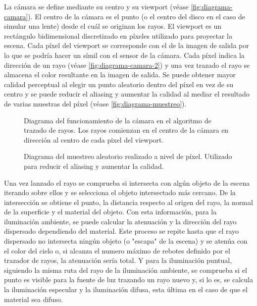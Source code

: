\documentclass[10pt, a4paper]{article}
\begin{document}
La cámara se define mediante su centro y su viewport (véase \autoref{fig:diagrama-camara}). El centro de la cámara es el punto (o el centro del disco en el caso de simular una lente) desde el cuál se originan los rayos. El viewport es un rectángulo bidimensional discretizado en píxeles utilizado para proyectar la escena. Cada píxel del viewport se corresponde con el de la imagen de salida por lo que se podría hacer un símil con el sensor de la cámara. Cada píxel indica la dirección de un rayo (véase \autoref{fig:diagrama-camara-2}) y una vez trazado el rayo se almacena el color resultante en la imagen de salida. Se puede obtener mayor calidad perceptual al elegir un punto aleatorio dentro del píxel en vez de su centro y se puede reducir el aliasing y aumentar la calidad al mediar el resultado de varias muestras del píxel (véase \autoref{fig:diagrama-muestreo}).

\begin{figure}[H]
    \centering 
    
    \caption{Diagrama del funcionamiento de la cámara en el algoritmo de trazado de rayos. Los rayos comienzan en el centro de la cámara en dirección al centro de cada pixel del viewport.}
    \label{fig:diagrama-camara-2}
\end{figure}




\begin{figure}[H]
    \centering 
    
    \caption{Diagrama del muestreo aleatorio realizado a nivel de píxel. Utilizado para reducir el aliasing y aumentar la calidad.}
    \label{fig:diagrama-muestreo}
\end{figure}


Una vez lanzado el rayo se comprueba si intersecta con algún objeto de la escena iterando sobre ellos y se selecciona el objeto intersectado más cercano. De la intersección se obtiene el punto, la distancia respecto al origen del rayo, la normal de la superficie y el material del objeto. Con esta información, para la iluminación ambiente, se puede calcular la atenuación y la dirección del rayo dispersado dependiendo del material. Este proceso se repite hasta que el rayo dispersado no intersecta ningún objeto (o "escapa" de la escena) y se atenúa con el color del cielo o, si alcanza el numero máximo de rebotes definido por el trazador de rayos, la atenuación sería total. Y para la iluminación puntual, siguiendo la misma ruta del rayo de la iluminación ambiente, se comprueba si el punto es visible para la fuente de luz trazando un rayo nuevo y, si lo es, se calcula la iluminación especular y la iluminación difusa, esta última en el caso de que el material sea difuso. 
\end{document}
